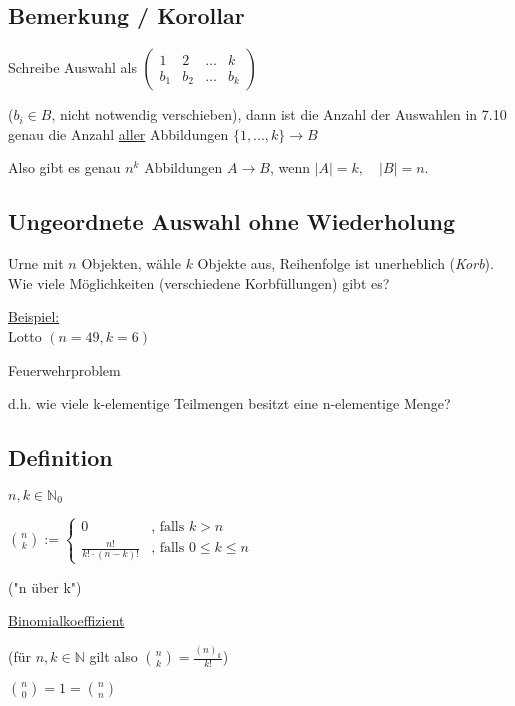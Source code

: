 \documentclass[a4paper, 12pt, twoside] {article}
\begin{document}
\subsection{Bemerkung / Korollar} %

Schreibe Auswahl als \quad
$
\begin{pmatrix}
1 & 2 & ... & k \\
b_1 & b_2 & ... & b_k
\end{pmatrix}
$

($b_i \in B$, nicht notwendig verschieben), dann ist die Anzahl der Auswahlen in 7.10 genau die Anzahl \uline{aller} Abbildungen $\{1, ... ,k\} \rightarrow B$

Also gibt es genau $n^k$ Abbildungen $A \rightarrow B$, wenn $|A| = k, \quad |B| = n$.

\subsection{Ungeordnete Auswahl ohne Wiederholung} %

Urne mit $n$ Objekten, wähle $k$ Objekte aus, Reihenfolge ist unerheblich (\textit{Korb}). Wie viele Möglichkeiten (verschiedene Korbfüllungen) gibt es?

\uline{Beispiel:} \\
Lotto $(n = 49, k = 6)$

Feuerwehrproblem



d.h. wie viele k-elementige Teilmengen besitzt eine n-elementige Menge?

\subsection[Definition (Binomialkoeffizient)]{Definition} %

$n,k \in \mathbb{N}_0$

$\binom{n}{k} := \begin{cases}
0 & \text{, falls } k > n \\
\frac{n!}{k! \cdot (n-k)!} & \text{, falls } 0 \leq k \leq n
\end{cases}$

("n über k")

\underline{Binomialkoeffizient}

(für $n,k \in \mathbb{N}$ gilt also $\binom{n}{k} = \frac{(n)_k}{k!}$)

$\binom{n}{0} = 1 = \binom{n}{n}$
\end{document}

